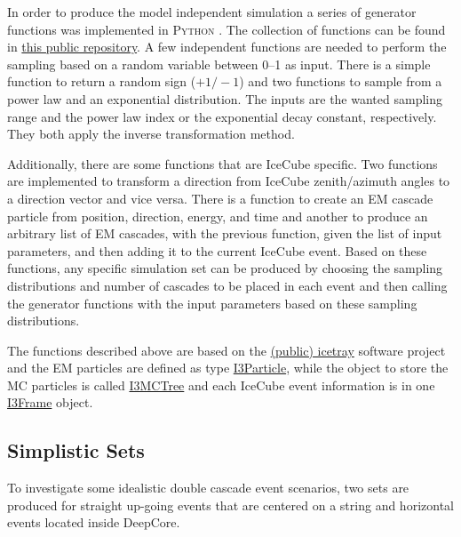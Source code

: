In order to produce the model independent simulation a series of generator functions was implemented in \textsc{Python} . The collection of functions can be found in \href{https://github.com/LeanderFischer/icetray_double_cascade_generator_functions}{this public repository}. A few independent functions are needed to perform the sampling based on a random variable between \SIrange[range-phrase={~and~}]{0}{1}{} as input. There is a simple function to return a random sign ($+1/-1$) and two functions to sample from a power law and an exponential distribution. The inputs are the wanted sampling range and the power law index or the exponential decay constant, respectively. They both apply the inverse transformation method.

Additionally, there are some functions that are IceCube specific. Two functions are implemented to transform a direction from IceCube zenith/azimuth angles to a direction vector and vice versa. There is a function to create an EM cascade particle from position, direction, energy, and time and another to produce an arbitrary list of EM cascades, with the previous function, given the list of input parameters, and then adding it to the current IceCube event. Based on these functions, any specific simulation set can be produced by choosing the sampling distributions and number of cascades to be placed in each event and then calling the generator functions with the input parameters based on these sampling distributions.
\begin{kaobox}[frametitle=IceCube software framework]
    The functions described above are based on the \href{https://github.com/icecube/icetray-public}{(public) icetray} software project and the EM particles are defined as type \href{https://docs.icecube.aq/icetray/main/projects/dataclasses/particle.html#i3particle}{I3Particle}, while the object to store the MC particles is called \href{https://docs.icecube.aq/icetray/main/projects/dataclasses/i3mctree.html#i3mctree}{I3MCTree} and each IceCube event information is in one \href{https://docs.icecube.aq/icetray/main/projects/icetray/classes/i3frame.html#index-0}{I3Frame} object.
\end{kaobox}


\subsection{Simplistic Sets}

To investigate some idealistic double cascade event scenarios, two sets are produced for straight up-going events that are centered on a string and horizontal events located inside DeepCore.

